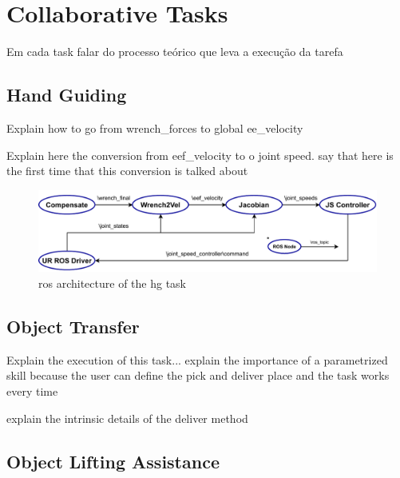 \chapter{Collaborative Tasks}
\label{chapter:colab-tasks}

\par Em cada task falar do processo teórico que leva a execução da tarefa 

\section{Hand Guiding}

\par Explain how to go from wrench\_forces to global ee\_velocity

\par Explain here the conversion from eef\_velocity to o joint speed. say that here is the first time that this conversion is talked about 


\begin{figure}[h]
    \centering
    \includegraphics[width=\linewidth]{figs/chp4/ros_hg_arch.pdf}
    \caption{\ac{ros} architecture of the \ac{hg} task}
    \label{fig:ros_hg_arch}
\end{figure}

\section{Object Transfer}

\par Explain the execution of this task... explain the importance of a parametrized skill because the user can define the pick and deliver place and the task works every time
\par explain the intrinsic details of the deliver method

\section{Object Lifting Assistance}

